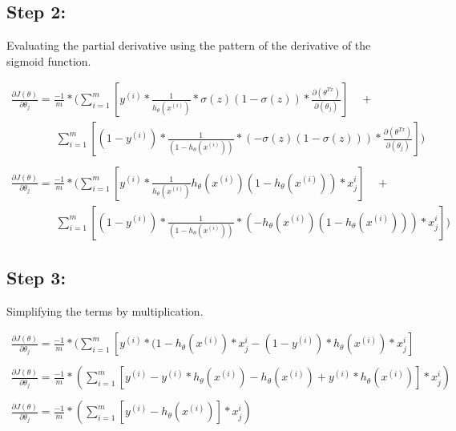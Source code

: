 \documentclass[10pt,a4paper]{article}
\begin{document}
\subsection*{Step 2:}
Evaluating the partial derivative using the pattern of the derivative of the sigmoid function.

\begin{equation*}
\begin{array}{l}
	\frac{\partial J(\theta)}{\partial \theta_j} = \frac{-1}{m}*(\sum_{i=1}^m [y^{(i)}*\frac{1}			{h_\theta(x^{(i)})}*\sigma(z)(1-\sigma(z))*\frac{\partial(\theta^{Tx})}{\partial(\theta_j)}] \quad	+ \\
	\qquad \qquad \sum_{i=1}^m [ (1-y^{(i)})*\frac{1}{(1-h_\theta(x^{(i)}))}*
	(-\sigma(z)(1-\sigma(z)))*\frac{\partial(\theta^{Tx})}{\partial(\theta_j)}])\\
\\
	\frac{\partial J(\theta)}{\partial \theta_j} = \frac{-1}{m}*(\sum_{i=1}^m [y^{(i)}*\frac{1}			{h_\theta(x^{(i)})}h_\theta(x^{(i)})(1-h_\theta(x^{(i)}))*x_j^{i}] \quad + \\
	\qquad \qquad \sum_{i=1}^m [ (1-y^{(i)})*\frac{1}{(1-h_\theta(x^{(i)}))}*(-h_\theta(x^{(i)})		(1-h_\theta(x^{(i)})))*x_j^{i}])

\end{array}
\end{equation*}


\subsection*{Step 3:}
Simplifying the terms by multiplication.

\begin{equation*}
\begin{array}{l}
	\frac{\partial J(\theta)}{\partial \theta_j} = \frac{-1}{m}*(\sum_{i=1}^m [y^{(i)}*(1-				h_\theta(x^{(i)})*x_j^{i} - (1-y^{(i)})*h_\theta(x^{(i)})*x_j^{i}]\\
	\\
	\frac{\partial J(\theta)}{\partial \theta_j} = \frac{-1}{m}*(\sum_{i=1}^m [y^{(i)} - y^{(i)}		*h_\theta(x^{(i)})-h_\theta(x^{(i)}) +y^{(i)}*h_\theta(x^{(i)})]*x_j^{i})\\
\\
	\frac{\partial J(\theta)}{\partial \theta_j} = \frac{-1}{m}*(\sum_{i=1}^m [y^{(i)} - 				h_\theta(x^{(i)})]*x_j^{i})
\end{array}
\end{equation*}
\end{document}
